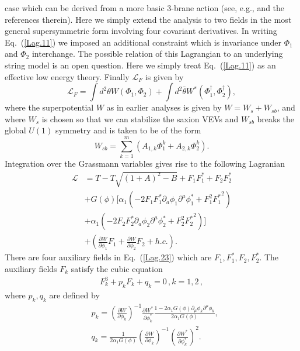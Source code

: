 \documentclass[12pt]{article}
\def\non{\nonumber\\}
\begin{document}
  case which can be derived from a more basic 3-brane action 
  (see, e.g., \cite{Rocek:1997hi,Tseytlin:1999dj,Sasaki:2012ka} and the references
  therein). Here we simply extend the analysis to two fields
  in the most general supersymmetric form involving four covariant derivatives. In writing Eq.~(\ref{Lag.11}) we imposed
  an additional constraint which is invariance under $\Phi_1$ and $\Phi_2$ interchange.
  The possible relation of this Lagrangian
  to an underlying string model is an open question. Here we simply treat Eq.~(\ref{Lag.11}) as an effective low energy
  theory. Finally $\mathcal{L}_{F}$ is given by
  \begin{equation}
    \mathcal{L}_{F}=\int d^2\theta W\left(\Phi_1,\Phi_2\right)+\int d^2\bar\theta
    W^* \left(\Phi_1^\dagger,\Phi_2^\dagger\right),
  \end{equation}
  where the superpotential $W$ as in earlier analyses   is given by  $W=W_s+W_{sb}$, and where 
  $W_s$ is chosen so that we can stabilize the saxion VEVs 
  and $W_{sb}$ breaks the global $U(1)$ symmetry and is taken to be of the form
  \begin{equation}
    W_{sb}=\sum_{k=1}^m\left(A_{1, k}\Phi_1^k+A_{2, k}\Phi_2^k\right).
    \label{w3}
  \end{equation}
  Integration over the Grassmann variables gives rise to the following Lagranian\\
  \begin{align}
    \mathcal{L}
      &=  
      T - T \sqrt{(1+A)^2 - B}+ F_1 F^*_1 + F_2 F^*_2\non
     & + G(\phi) \Big[ \alpha_1(-2 F_1 F^*_1 \partial_a\phi_1 \partial^a \phi^*_1
      + F_1^2 {F^*_1}^2)\non
     & + \alpha_1 (-2 F_2 F^*_2 \partial_a\phi_2 \partial^a \phi^*_2 
     + F_2^2 {F^*_2}^2)\Big]
     \non
    & + \left(\frac{\partial W}{\partial \phi_1}F_1+ \frac{\partial W}{\partial \phi_2}F_2 + h.c.\right).
    \label{Lag.23}
  \end{align}
  There are four auxiliary fields in Eq.~(\ref{Lag.23}) which are $F_1, F^*_1, F_2, F^*_2$.
  The auxiliary fields $F_k$ satisfy the cubic equation
  \begin{align}
    F_k^3+ p_k F_k + q_k=0\,, k=1,2\,,
  \end{align}
  where $p_k, q_k$ are defined by
  \begin{equation}\label{DisplayFormulaNumbered:eq.twoDBI.p.1}
  \begin{split}
    & p_k={\left(\frac{\partial W}{\partial \phi_k}\right)}^{-1}\frac{\partial W^*}{\partial \phi^*_k}\frac{1-2\alpha_1 G\left(\phi\right)\partial_\mu \phi_k\partial^\mu \phi_k}{2\alpha_1 G\left(\phi\right)}, \\
    & q_k=\frac{1}{2\alpha_1 G\left(\phi\right)}{\left(\frac{\partial W}{\partial \phi_k}\right)}^{-1}{\left(\frac{\partial W^*}{\partial \phi^*_k}\right)}^2. \\
  \end{split}
  \end{equation}
\end{document}
